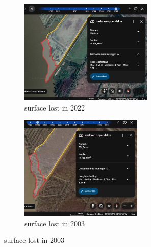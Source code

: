 \begin{figure}[H]
    \centering
    \begin{subfigure}[b]{0.48\textwidth}
        \includegraphics[width=\linewidth, height =5cm]{figures/appendix-g/verlorenopp2022.png}
        \caption{surface lost in 2022}
        \label{fig:second}
    \end{subfigure}
    \hfill
    \begin{subfigure}[b]{0.48\textwidth}
        \includegraphics[width=\linewidth, height =5cm]{figures/appendix-g/verlorenopp2003.png}
        \caption{surface lost in 2003}
        \label{fig:second}
    \end{subfigure}
    

    \vspace{0.5cm}


\end{figure}

